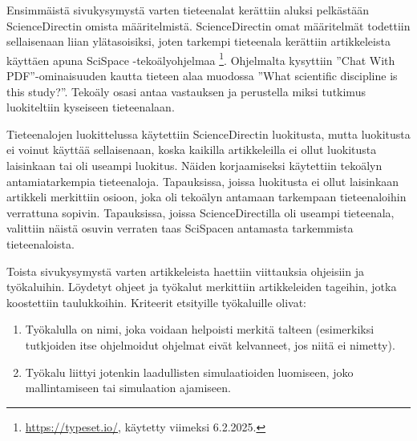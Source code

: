 \documentclass[utf8]{gradu3}
\begin{document}
\begin{table}[h]
\centering
{}
\caption{Testiaineistosta johdettu alustava luokittelu tutkimusten tavoitteille}
\label{table: testausera}
\end{table}

Ensimmäistä sivukysymystä varten tieteenalat kerättiin aluksi 
pelkästään ScienceDirectin omista määritelmistä. 
ScienceDirectin omat määritelmät todettiin sellaisenaan liian ylätasoisiksi, 
joten tarkempi tieteenala kerättiin artikkeleista käyttäen apuna 
SciSpace -tekoälyohjelmaa 
\footnote{\url{https://typeset.io/}, käytetty viimeksi 6.2.2025.}. 
Ohjelmalta kysyttiin ''Chat With PDF''-ominaisuuden 
kautta tieteen alaa muodossa ''What scientific discipline is this study?''. 
Tekoäly osasi antaa vastauksen ja perustella miksi tutkimus 
luokiteltiin kyseiseen tieteenalaan. 

Tieteenalojen luokittelussa käytettiin ScienceDirectin luokitusta, mutta
luokitusta ei voinut käyttää sellaisenaan, 
koska kaikilla artikkeleilla ei ollut luokitusta laisinkaan tai oli useampi luokitus. 
Näiden korjaamiseksi käytettiin tekoälyn antamiatarkempia tieteenaloja.
Tapauksissa, joissa luokitusta ei ollut laisinkaan artikkeli merkittiin osioon,
joka oli tekoälyn antamaan tarkempaan tieteenaloihin verrattuna sopivin.
Tapauksissa, joissa ScienceDirectilla oli useampi tieteenala, valittiin näistä
osuvin verraten taas SciSpacen antamasta tarkemmista tieteenaloista.

Toista sivukysymystä varten artikkeleista haettiin viittauksia ohjeisiin ja työkaluihin. Löydetyt ohjeet ja työkalut merkittiin artikkeleiden tageihin, jotka koostettiin taulukkoihin.
Kriteerit etsityille työkaluille olivat:
\begin{enumerate}
    \item Työkalulla on nimi, joka voidaan helpoisti merkitä talteen (esimerkiksi tutkjoiden itse ohjelmoidut ohjelmat eivät kelvanneet, jos niitä ei nimetty).
    \item Työkalu liittyi jotenkin laadullisten simulaatioiden luomiseen, joko
    mallintamiseen tai simulaation ajamiseen.
\end{enumerate}
\end{document}
